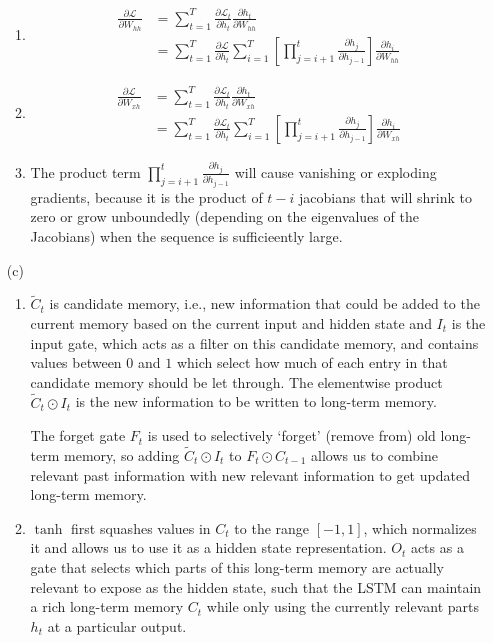 \documentclass{article}
\newcommand{\loss}{\mathcal{L}}
\newcommand{\pd}[2]{\frac{\partial #1}{\partial #2}}
\begin{document}
\begin{itemize}
\begin{enumerate}[label=(\roman*)]
            \item \begin{align*}
                \pd{\loss}{W_{hh}} &= \sum\limits_{t=1}^T \pd{\loss_t}{h_t} \pd{h_t}{W_{hh}}\\
                &= \sum\limits_{t=1}^T \pd{\loss}{h_t} \sum\limits_{i=1}^T \left[
                    \prod_{j=i+1}^t \pd{h_j}{h_{j-1}}
                \right] \pd{h_i}{W_{hh}}
            \end{align*}

            \item \begin{align*}
                \pd{\loss}{W_{xh}} &= \sum\limits_{t=1}^T \pd{\loss_t}{h_t} \pd{h_t}{W_{xh}}\\
                &= \sum\limits_{t=1}^T \pd{\loss_t}{h_t} \sum\limits_{i=1}^T \left[ \prod_{j=i+1}^t \pd{h_j}{h_{j-1}} \right] \pd{h_i}{W_{xh}}
            \end{align*}

            \item The product term $\prod_{j=i+1}^t \pd{h_j}{h_{j-1}} $ will cause vanishing or exploding gradients, because it is the product of $t - i$ jacobians that will shrink to zero or grow unboundedly (depending on the eigenvalues of the Jacobians) when the sequence is sufficieently large.
        \end{enumerate}

        \item[(c)] \begin{enumerate}[label=(\roman*)]
            \item $\tilde{C}_t$ is candidate memory, i.e., new information that could be added to the current memory based on the current input and hidden state and $I_t$ is the input gate, which acts as a filter on this candidate memory, and contains values between $0$ and $1$ which select how much of each entry in that candidate memory should be let through. The elementwise product $\tilde{C}_t \odot I_t$ is the new information to be written to long-term memory.
            
            The forget gate $F_t$ is used to selectively `forget' (remove from) old long-term memory, so adding $\tilde{C}_t \odot I_t$ to $F_t \odot C_{t-1}$ allows us to combine relevant past information with new relevant information to get updated long-term memory.

            \item $\tanh$ first squashes values in $C_t$ to the range $[-1, 1]$, which normalizes it and allows us to use it as a hidden state representation. $O_t$ acts as a gate that selects which parts of this long-term memory are actually relevant to expose as the hidden state, such that the LSTM can maintain a rich long-term memory $C_t$ while only using the currently relevant parts $h_t$ at a particular output.
        \end{enumerate}
\end{itemize}
\end{document}
